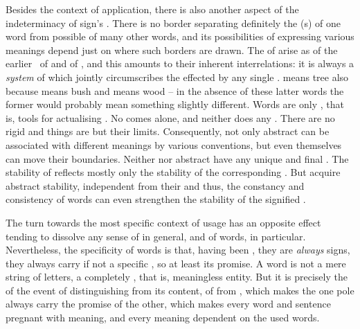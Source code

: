 Besides the context of application, there is also another aspect of the
indeterminacy of sign's .  There is no  border
separating definitely the (s) of one word from possible
 of many other words, and its possibilities of expressing various
meanings depend just on where such borders are drawn. {The  of
   arise as  of the earlier \nexuss\ of 
  and of , and this amounts to their inherent interrelations:
  it is always a {\em system} of  which jointly circumscribes the
   effected by any single .  means {tree}
  also because  means {bush} and  means {wood} -- in the
  absence of these latter words the former would probably mean something
  slightly different.}  Words are only , that is, tools for
actualising . No  comes alone, and neither does
any . There are no rigid  and things are but their
limits. Consequently, not only abstract  can be associated with
different meanings by various conventions, but even  themselves can
move their boundaries. Neither  nor abstract  have any
unique and final .  The stability of  reflects mostly
only the stability of the corresponding .  But  acquire abstract stability, independent from their  and
thus, the constancy and consistency of words can even strengthen the stability
of the signified .  

\pa
The turn towards the most specific context of  usage has an opposite
effect tending 
to dissolve any  sense of  in general, and of words,
in particular. 
Nevertheless, the specificity of words is that, having been , they are {\em always} signs, they always carry if not a specific
, so at least its promise. A word is not a mere string of letters, 
a completely , that is, meaningless entity. But 
it is precisely the  of the
event of distinguishing from its content, of  from , which
makes the one  pole always carry the promise of the other, which
makes every word and sentence pregnant with meaning, and every 
meaning dependent on the used words. 

